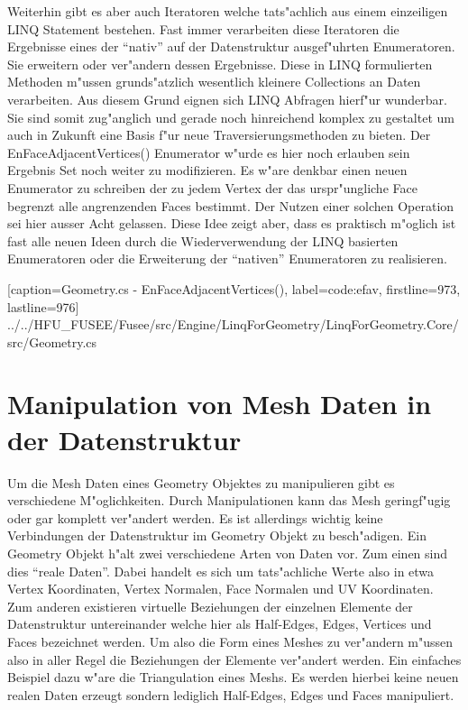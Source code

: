 \documentclass[pagesize, paper=a4, fontsize=12pt,titlepage=true, headings=small, headnosepline, abstractoff, liststotoc, nochapterprefix, plainheadsepline]{scrreprt}
\begin{document}
Weiterhin gibt es aber auch Iteratoren welche tats"achlich aus einem einzeiligen LINQ Statement bestehen. Fast immer verarbeiten diese Iteratoren die Ergebnisse eines der "`nativ"' auf der Datenstruktur ausgef"uhrten Enumeratoren. Sie erweitern oder ver"andern dessen Ergebnisse. Diese in LINQ formulierten Methoden m"ussen grunds"atzlich wesentlich kleinere Collections an Daten verarbeiten. Aus diesem Grund eignen sich LINQ Abfragen hierf"ur wunderbar. Sie sind somit zug"anglich und gerade noch hinreichend komplex zu gestaltet um auch in Zukunft eine Basis f"ur neue Traversierungsmethoden zu bieten.
Der EnFaceAdjacentVertices() Enumerator w"urde es hier noch erlauben sein Ergebnis Set noch weiter zu modifizieren. Es w"are denkbar einen neuen Enumerator zu schreiben der zu jedem Vertex der das urspr"ungliche Face begrenzt alle angrenzenden Faces bestimmt. Der Nutzen einer solchen Operation sei hier ausser Acht gelassen. Diese Idee zeigt aber, dass es praktisch m"oglich ist fast alle neuen Ideen durch die Wiederverwendung der LINQ basierten Enumeratoren oder die Erweiterung der "`nativen"' Enumeratoren zu realisieren.

			[caption={Geometry.cs - EnFaceAdjacentVertices()}, label=code:efav, firstline=973, lastline=976]
			{../../HFU_FUSEE/Fusee/src/Engine/LinqForGeometry/LinqForGeometry.Core/src/Geometry.cs}

	\section {Manipulation von Mesh Daten in der Datenstruktur}
		Um die Mesh Daten eines Geometry Objektes zu manipulieren gibt es verschiedene M"oglichkeiten. Durch Manipulationen kann das Mesh geringf"ugig oder gar komplett ver"andert werden. Es ist allerdings wichtig keine Verbindungen der Datenstruktur im Geometry Objekt zu besch"adigen. Ein Geometry Objekt h"alt zwei verschiedene Arten von Daten vor. Zum einen sind dies "`reale Daten"'. Dabei handelt es sich um tats"achliche Werte also in etwa Vertex Koordinaten, Vertex Normalen, Face Normalen und UV Koordinaten. Zum anderen existieren virtuelle Beziehungen der einzelnen Elemente der Datenstruktur untereinander welche hier als Half-Edges, Edges, Vertices und Faces bezeichnet werden. Um also die Form eines Meshes zu ver"andern m"ussen also in aller Regel die Beziehungen der Elemente ver"andert werden. Ein einfaches Beispiel dazu w"are die Triangulation eines Meshs. Es werden hierbei keine neuen realen Daten erzeugt sondern lediglich Half-Edges, Edges und Faces manipuliert.
\newline
\end{document}
